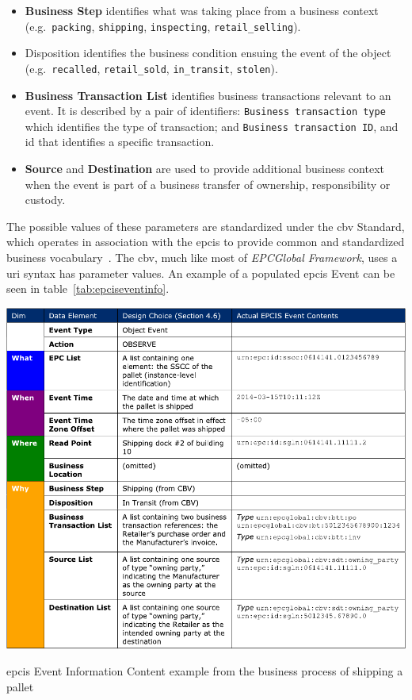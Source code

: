 \begin{itemize}
    \item \textbf{Business Step} identifies what was taking place from a business context (e.g.\ \texttt{packing}, \texttt{shipping}, \texttt{inspecting}, \texttt{retail\_selling}).
    \item \textbf{}{Disposition} identifies the business condition ensuing the event of the object (e.g.\ \texttt{recalled}, \texttt{retail\_sold}, \texttt{in\_transit}, \texttt{stolen}).
    \item \textbf{Business Transaction List} identifies business transactions relevant to an event. It is described by a pair of identifiers: \texttt{Business transaction type} which identifies the type of transaction; and \texttt{Business transaction ID}, and \ac{id} that identifies a specific transaction.
    \item \textbf{Source} and \textbf{Destination} are used to provide additional business context when the event is part of a business transfer of ownership, responsibility or custody.
\end{itemize}

The possible values of these parameters are standardized under the \ac{cbv} Standard, which operates in association with the \ac{epcis} to provide common and standardized business vocabulary~\cite{CoreBusinessVocabulary}. The \ac{cbv}, much like most of \emph{EPCGlobal Framework}, uses a \ac{uri} syntax has parameter values.
An example of a populated \ac{epcis} Event can be seen in table~\ref{tab:epciseventinfo}.

\begin{table}
    \centering
    \includegraphics[width=\textwidth]{./figs/02-state-of-the-art/epcis_data_visibility.pdf}
    \caption[\ac{epcis} Event Information Content example]{\ac{epcis} Event Information Content example from the business process of shipping a pallet~\cite{EPCISGuidelines}}
    \label{tab:epciseventinfo}
\end{table}

